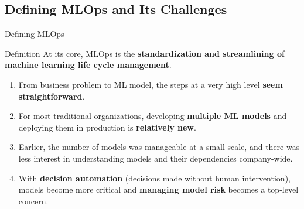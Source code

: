 \subsection{Defining MLOps and Its Challenges}

\begin{frame}{Defining MLOps}
\begin{block}{Definition}
At its core, MLOps is the \textbf{standardization and streamlining of machine learning life cycle management}.
\end{block}
\vspace{0.2cm}
\begin{enumerate}
\item<1-> From business problem to ML model, the steps at a very high level \textbf{seem straightforward}.
\item<2-> For most traditional organizations, developing \textbf{multiple ML models} and deploying them in production is \textbf{relatively new}.
\item<3-> Earlier, the number of models was manageable at a small scale, and there was less interest in understanding models and their dependencies company-wide.
\item<4-> With \textbf{decision automation} (decisions made without human intervention), models become more critical and \textbf{managing model risk} becomes a top-level concern.
\end{enumerate}
\end{frame}

